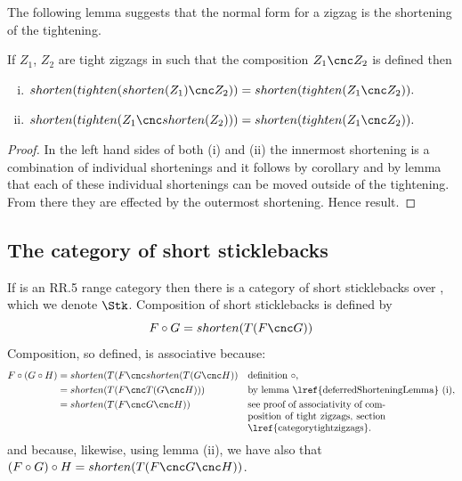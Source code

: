 \begin{aside}
The following lemma suggests that the normal form for a zigzag is the
shortening of the tightening.
\end{aside}
\begin{lemma}
If $Z_1$, $Z_2$ are tight zigzags in
 such that the composition $Z_1 \cnc Z_2$ is defined then
\begin{enumerate}[(i)]
\item 
$shorten(tighten(shorten(Z_1) \cnc Z_2))= shorten(tighten(Z_1 \cnc Z_2)).$
\item
$shorten(tighten(Z_1 \cnc shorten(Z_2)))= shorten(tighten(Z_1 \cnc Z_2)).$
\end{enumerate}
\end{lemma}
\begin{proof}
In the left hand sides of both (i) and (ii) 
the innermost shortening is a combination of individual shortenings
and it follows by  corollary 
and by lemma 
that each of these individual shortenings can be moved outside
of the tightening. 
From there they are effected by the outermost shortening. 
Hence result.
\end{proof}

\subsection{The category of short sticklebacks}

If \catcw is an RR.5 range category then
 there is a category of short sticklebacks over \catc, which we denote
 $\Stk$.
Composition of short sticklebacks is defined by
\[
F \circ G = shorten(T(F\cnc G)) 
\]
Composition, so defined, is associative because:
\begin{align*}
F \circ (G \circ H)
  &= shorten(T(F \cnc shorten(T(G \cnc H)) && \mbox{definition $\circ$,} \\
  &= shorten (T(F\cnc T(G\cnc H))) && \mbox{by lemma \lref{deferredShorteningLemma} (i),} \\
  &= shorten (T(F\cnc G\cnc H))    && \mbox{\parbox[t]{5cm}{see proof of associativity of composition of tight zigzags, section \lref{categorytightzigzags}.}}
\end{align*}  
and because, likewise, 
using lemma  (ii),
we have also that $(F \circ G) \circ H=shorten (T(F \cnc G \cnc H))$.

